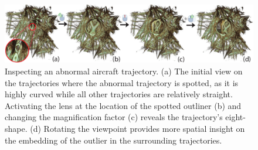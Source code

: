 \begin{figure}[htbp]
\includegraphics [width=\textwidth]{images/aircraft_lens.pdf}
\caption{Inspecting an abnormal aircraft trajectory. (a) The initial view on the trajectories where the abnormal trajectory is spotted, as it is highly curved while all other trajectories are relatively straight. Activating the lens at the location of the spotted outliner (b) and changing the magnification factor (c) reveals the trajectory's eight-shape. (d) Rotating the viewpoint provides more spatial insight on the embedding of the outlier in the surrounding trajectories.}
\label{f:aircraft_lens}
\end{figure}
%

